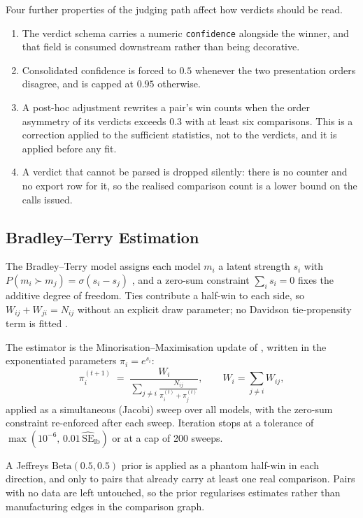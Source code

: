 Four further properties of the judging path affect how verdicts should
be read.

\begin{enumerate}
\item The verdict schema carries a numeric \texttt{confidence}
alongside the winner, and that field is consumed downstream rather than
being decorative.
\item Consolidated confidence is forced to $0.5$ whenever the two
presentation orders disagree, and is capped at $0.95$ otherwise.
\item A post-hoc adjustment rewrites a pair's win counts when the
order asymmetry of its verdicts exceeds $0.3$ with at least six
comparisons. This is a correction applied to the sufficient statistics,
not to the verdicts, and it is applied before any fit.
\item A verdict that cannot be parsed is dropped silently: there is no
counter and no export row for it, so the realised comparison count is a
lower bound on the calls issued.
\end{enumerate}

\subsection{Bradley--Terry Estimation}\label{sec:meth-bt}

The Bradley--Terry model assigns each model $m_i$ a latent strength
$s_i$ with $P(m_i \succ m_j) = \sigma(s_i - s_j)$
\parencite{bradley1952rank}, and a zero-sum constraint
$\sum_i s_i = 0$ fixes the additive degree of freedom. Ties contribute
a half-win to each side, so $W_{ij} + W_{ji} = N_{ij}$ without an
explicit draw parameter; no Davidson tie-propensity term is fitted
\parencite{davidson1970ties}.

The estimator is the Minorisation--Maximisation update of
\textcite{hunter2004mm}, written in the exponentiated parameters
$\pi_i = e^{s_i}$:
\[
\pi_i^{(t+1)} \;=\;
\frac{W_i}{\displaystyle\sum_{j \neq i}
\frac{N_{ij}}{\pi_i^{(t)} + \pi_j^{(t)}}},
\qquad W_i = \sum_{j \neq i} W_{ij},
\]
applied as a simultaneous (Jacobi) sweep over all models, with the
zero-sum constraint re-enforced after each sweep. Iteration stops at a
tolerance of $\max(10^{-6},\, 0.01\,\widehat{\mathrm{SE}}_{\text{lb}})$
or at a cap of 200 sweeps.

A Jeffreys $\mathrm{Beta}(0.5, 0.5)$ prior is applied as a phantom
half-win in each direction, and only to pairs that already carry at
least one real comparison. Pairs with no data are left untouched, so
the prior regularises estimates rather than manufacturing edges in the
comparison graph.

